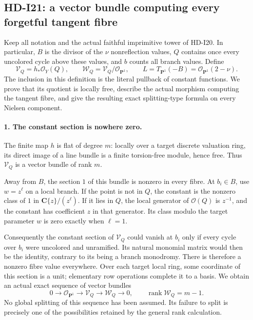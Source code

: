 \subsection{HD-I21: a vector bundle computing every forgetful tangent fibre}
\label{sec:HD-I21}

Keep all notation and the actual faithful imprimitive tower of HD-I20.
In particular, $B$ is the divisor of the $\nu$ nonreflection values,
$Q$ contains once every uncolored cycle above these values, and
$b$ counts all branch values. Define
\begin{equation}
 \mathcal V_Q=h_*\mathcal O_Y(Q),\qquad
 \mathcal W_Q=\mathcal V_Q/\mathcal O_{\mathbf P^1},\qquad
 L=T_{\mathbf P^1}(-B)=\mathcal O_{\mathbf P^1}(2-\nu).
                                                        \tag{I21.1}
\end{equation}
The inclusion in this definition is the literal pullback of constant
functions. We prove that its quotient is locally free, describe the
actual morphism computing the tangent fibre, and give the resulting
exact splitting-type formula on every Nielsen component.

\paragraph{1. The constant section is nowhere zero.}
The finite map $h$ is flat of degree $m$: locally over a target
discrete valuation ring, its direct image of a line bundle is a
finite torsion-free module, hence free. Thus $\mathcal V_Q$ is a
vector bundle of rank $m$.

Away from $B$, the section $1$ of this bundle is nonzero in every
fibre. At $b_i\in B$, use $w=z^\ell$ on a local branch. If the
point is not in $Q$, the constant is the nonzero class of $1$ in
$\mathbf C\{z\}/(z^\ell)$. If it lies in $Q$, the local generator
of $\mathcal O(Q)$ is $z^{-1}$, and the constant has coefficient
$z$ in that generator. Its class modulo the target parameter $w$
is zero exactly when $\ell=1$.

Consequently the constant section of $\mathcal V_Q$ could vanish
at $b_i$ only if every cycle over $b_i$ were uncolored and
unramified. Its natural monomial matrix would then be the identity,
contrary to its being a branch monodromy. There is therefore a
nonzero fibre value everywhere. Over each target local ring, some
coordinate of this section is a unit; elementary row operations
complete it to a basis. We obtain an actual exact sequence of
vector bundles
\begin{equation}
 0\longrightarrow\mathcal O_{\mathbf P^1}
      \longrightarrow\mathcal V_Q
      \longrightarrow\mathcal W_Q\longrightarrow0,
 \qquad \operatorname{rank}\mathcal W_Q=m-1.           \tag{I21.2}
\end{equation}
No global splitting of this sequence has been assumed. Its
failure to split is precisely one of the possibilities retained
by the general rank calculation.

